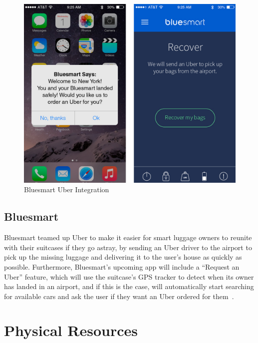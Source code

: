       \begin{figure}
        \centering
        \begin{minipage}{14cm}
          \centering
          \includegraphics[width=14cm]{inc/bluesmart_uber_integration.png}
          \caption[Bluesmart Uber Integration]{Bluesmart Uber Integration~\parencite{bluesmart2015}}
          \label{fig:bluesmart_uber_integration}
        \end{minipage}
      \end{figure}

    \subsection{Bluesmart}\label{subsec:bluesmart}

      Bluesmart teamed up Uber to make it easier for smart luggage owners to reunite with their suitcases if they go astray, by sending an Uber driver to the airport to pick up the missing luggage and delivering it to the user's house as quickly as possible. Furthermore, Bluesmart's upcoming app will include a ``Request an Uber'' feature, which will use the suitcase's GPS tracker to detect when its owner has landed in an airport, and if this is the case, will automatically start searching for available cars and ask the user if they want an Uber ordered for them~\parencite{heim2015}.

  \section{Physical Resources}\label{sec:physical_resources}

